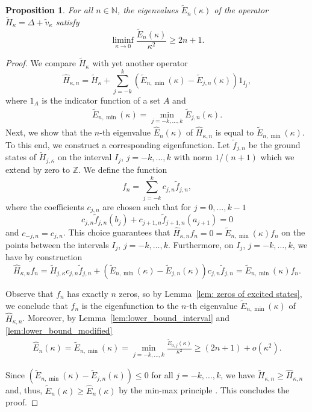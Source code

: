 \documentclass[12pt, reqno]{amsart}
\newtheorem{proposition}[theorem]{Proposition}
\theoremstyle{definition}
\numberwithin{equation}{section}
\newcommand{\Z}{{\mathbb Z}}
\newcommand{\N}{{\mathbb N}}
\begin{document}
\begin{proposition}\label{prop:lower_bound_modified}
    For all  $n\in \N$,  the eigenvalues $\tilde E_{n}(\kappa)$ of the operator $\tilde H_{\kappa}=\Delta + \tilde v_{\kappa}$ satisfy
    $$\liminf_{\kappa\to 0}\frac{\tilde E_{n}(\kappa)}{\kappa^2} \geq   2n+1.$$
\end{proposition}
\begin{proof}
    We compare $\tilde H_{\kappa}$ with yet another operator
    $$\hat H_{\kappa,n} = \tilde H_\kappa +\sum_{j=-k}^k (\tilde E_{n,\min} (\kappa)- \tilde E_{j,n}(\kappa))1_{I_j}, $$
    where $1_A$ is the indicator function of a set $A$ and
    \begin{align*}
        \tilde E_{n,\min}(\kappa) = \min_{j=-k,\ldots,k} \tilde E_{j,n}(\kappa).
    \end{align*}
    Next, we show that the $n$-th eigenvalue $\hat E_n(\kappa)$ of $\hat H_{\kappa,n}$ is equal to $\tilde E_{n,\min}(\kappa)$. 
    To this end, we construct a corresponding eigenfunction. Let $\tilde f_{j,n}$ be the ground states of $\tilde H_{j,\kappa}$ on the interval $I_j$, $j=-k,\ldots,k$ with norm $1/(n+1)$ which we extend by zero to $\Z$. We define the function
    $$f_n = \sum_{j=-k}^k c_{j,n}\tilde f_{j,n},$$
   where the coefficients $c_{j,n}$ are chosen such that for $j=0,\ldots,k-1$
   $$
   c_{j,n}\tilde f_{j,n}(b_j) + c_{j+1,n}\tilde f_{j+1,n}(a_{j+1})=0$$
   and $c_{-j,n}=c_{j,n}$. 
   This choice guarantees that $\hat H_{\kappa,n} f_n=0=\tilde E_{n,\min}(\kappa) f_n$ on the points between the intervals $I_j$, $j=-k,\ldots,k$. Furthermore, on $ I_j$, $j=-k,\ldots,k$, we have by construction
   $$\hat H_{\kappa,n} f_n  = \tilde H_{j,\kappa} c_{j,n}\tilde f_{j,n}+ (\tilde E_{n,\min}(\kappa)- \tilde E_{j,n}(\kappa)) c_{j,n}\tilde f_{j,n}  = \tilde E_{n,\min}(\kappa) f_n. $$
   
   Observe that $f_n$ has exactly $n$ zeros, so by Lemma~\ref{lem: zeros of excited states}, we conclude that $f_n$ is the eigenfunction to the $n$-th eigenvalue $\tilde E_{n,\min}(\kappa)$ of $\hat H_{\kappa,n}$.
   Moreover, by Lemma~\ref{lem:lower_bound_interval} and \ref{lem:lower_bound_modified}
    \begin{align*}
      \hat E_n(\kappa)= \tilde E_{n,\min}(\kappa)=\min_{j=-k,\ldots,k} \frac{\tilde E_{0,j}(\kappa)}{\kappa^2} \geq (2n+1) +o(\kappa^2).
    \end{align*}
    

   Since $(\tilde E_{n,\min} (\kappa)- \tilde E_{j,n}(\kappa))\le0$ for all $j=-k,\ldots,k$, we have
   $\tilde H_{\kappa,n}\geq \hat H_{\kappa,n}$ and, thus, $\tilde E_{n} (\kappa)\ge \hat E_n(\kappa)$ by the min-max principle \cite{RS_78}.
    This concludes the proof.
\end{proof}
\end{document}
